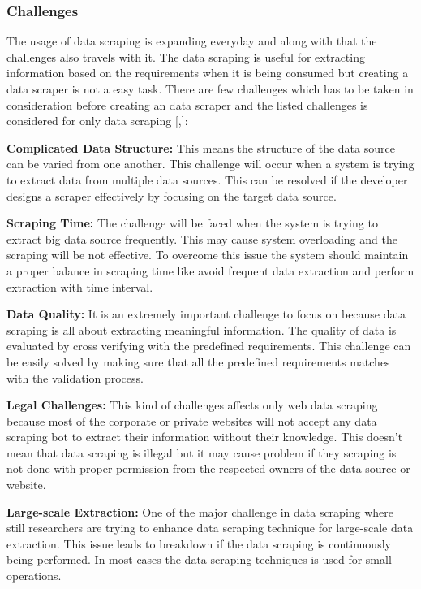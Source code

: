 \subsubsection{Challenges}
%
%
The usage of data scraping is expanding everyday and along with that the challenges also travels with it. The data scraping is useful for extracting information based on the requirements when it is being consumed but creating a data scraper is not a easy task. There are few challenges which has to be taken in consideration before creating an data scraper and the listed challenges is considered for only data scraping [\cite{And2021},\cite{Mic2020}]:

{\bf Complicated Data Structure:} This means the structure of the data source can be varied from one another. This challenge will occur when a system is trying to extract data from multiple data sources. This can be resolved if the developer designs a scraper effectively by focusing on the target data source.

{\bf Scraping Time:} The challenge will be faced when the system is trying to extract big data source frequently. This may cause system overloading and the scraping will be not effective. To overcome this issue the system should maintain a proper balance in scraping time like avoid frequent data extraction and perform extraction with time interval.

{\bf Data Quality:} It is an extremely important challenge to focus on because data scraping is all about extracting meaningful information. The quality of data is evaluated by cross verifying with the predefined requirements. This challenge can be easily solved by making sure that all the predefined requirements matches with the validation process.

{\bf Legal Challenges:} This kind of challenges affects only web data scraping because most of the corporate or private websites will not accept any data scraping bot to extract their information without their knowledge. This doesn't mean that data scraping is illegal but it may cause problem if they scraping is not done with proper permission from the respected owners of the data source or website.

{\bf Large-scale Extraction:} One of the major challenge in data scraping where still researchers are trying to enhance data scraping technique for large-scale data extraction. This issue leads to breakdown if the data scraping is continuously being performed. In most cases the data scraping techniques is used for small operations.
 
